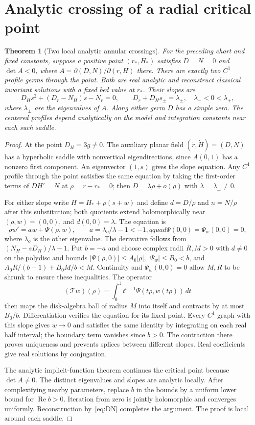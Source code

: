 \documentclass[12pt,a4paper,oneside]{report}
\numberwithin{equation}{chapter}
\newtheorem{theorem}{Theorem}[chapter]
\theoremstyle{remark}\newtheorem{remark}[theorem]{Remark}
\begin{document}
\section{Analytic crossing of a radial critical point}
\begin{theorem}[Two local analytic annular crossings]\label{thm:critical}
For the preceding chart and fixed constants, suppose a positive point $(r_*,H_*)$ satisfies $D=N=0$ and $\det A<0$, where $A=\partial(D,N)/\partial(r,H)$ there. There are exactly two $C^1$ profile germs through the point. Both are real analytic and reconstruct classical invariant solutions with a fixed bed value at $r_*$. Their slopes are
\[
 D_H s^2+(D_r-N_H)s-N_r=0,\qquad
 D_r+D_Hs_\pm=\lambda_\pm,\quad \lambda_-<0<\lambda_+,
\]
where $\lambda_\pm$ are the eigenvalues of $A$. Along either germ $D$ has a simple zero. The centered profiles depend analytically on the model and integration constants near each such saddle.
\end{theorem}
\begin{proof}
At the point $D_H=3g\ne0$. The auxiliary planar field $(\dot r,\dot H)=(D,N)$ has a hyperbolic saddle with nonvertical eigendirections, since $A(0,1)$ has a nonzero first component. An eigenvector $(1,s)$ gives the slope equation. Any $C^1$ profile through the point satisfies the same equation by taking the first-order terms of $DH'=N$ at $\rho=r-r_*=0$; then $D=\lambda\rho+o(\rho)$ with $\lambda=\lambda_\pm\ne0$.

For either slope write $H=H_*+\rho(s+w)$ and define $d=D/\rho$ and $n=N/\rho$ after this substitution; both quotients extend holomorphically near $(\rho,w)=(0,0)$, and $d(0,0)=\lambda$. The equation is
\[
 \rho w' = a w+\Psi(\rho,w),\qquad
 a=\lambda_o/\lambda-1<-1,qquad
 \Psi(0,0)=\Psi_w(0,0)=0 ,
\]
where $\lambda_o$ is the other eigenvalue. The derivative follows from $(N_H-sD_H)/\lambda-1$. Put $b=-a$ and choose complex radii $R,M>0$ with $d\ne0$ on the polydisc and bounds
$|\Psi(\rho,0)|\le A_0|\rho|$, $|\Psi_w|\le B_0<b$, and $A_0R/(b+1)+B_0M/b<M$. Continuity and $\Psi_w(0,0)=0$ allow $M,R$ to be shrunk to ensure these inequalities. The operator
\[
 (\mathcal T w)(\rho)=\int_0^1 t^{b-1}\Psi(t\rho,w(t\rho))\,dt
\]
then maps the disk-algebra ball of radius $M$ into itself and contracts by at most $B_0/b$. Differentiation verifies the equation for its fixed point. Every $C^1$ graph with this slope gives $w\to0$ and satisfies the same identity by integrating on each real half interval; the boundary term vanishes since $b>0$. The contraction there proves uniqueness and prevents splices between different slopes. Real coefficients give real solutions by conjugation.

The analytic implicit-function theorem continues the critical point because $\det A\ne0$. The distinct eigenvalues and slopes are analytic locally. After complexifying nearby parameters, replace $b$ in the bounds by a uniform lower bound for $\operatorname{Re}b>0$. Iteration from zero is jointly holomorphic and converges uniformly. Reconstruction by~\eqref{eq:DN} completes the argument. The proof is local around each saddle.
\end{proof}
\end{document}
